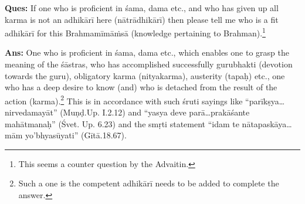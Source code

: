 \textbf{Ques:} If one who is proficient in śama, dama etc., and who has given up all karma is not an adhikārī here (nātrādhikārī) then please tell me who is a fit adhikārī for this Brahmamīmāṁsā (knowledge pertaining to Brahman).\footnote{This seems a counter question by the Advaitin.}

\textbf{Ans:} One who is proficient in śama, dama etc., which enables one to grasp the meaning of the śāstras, who has accomplished successfully gurubhakti (devotion towards the guru), obligatory karma (nityakarma), austerity (tapaḥ) etc., one who has a deep desire to know (and) who is detached from the result of the action (karma).\footnote{Such a one is the competent adhikārī needs to be added to complete the answer.} This is in accordance with such śruti sayings like “parīkṣya…nirvedamayāt” (Muṇḍ.Up. I.2.12) and “yasya deve parā…prakāśante mahātmanaḥ” (Śvet. Up. 6.23) and the smṛti statement “idam te nātapaskāya…mām yo’bhyasūyati” (Gītā.18.67). 

